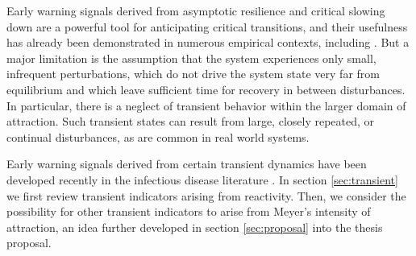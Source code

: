 Early warning signals derived from asymptotic resilience and critical slowing down are a powerful tool for anticipating critical transitions, and their usefulness has already been demonstrated in numerous empirical contexts, including . But a major limitation is the assumption that the system experiences only small, infrequent perturbations, which do not drive the system state very far from equilibrium and which leave sufficient time for recovery in between disturbances. In particular, there is a neglect of transient behavior within the larger domain of attraction. Such transient states can result from large, closely repeated, or continual disturbances, as are common in real world systems.  

Early warning signals derived from certain transient dynamics have been developed recently in the infectious disease literature \cite{oreganTransientIndicatorsTipping2020}. In section \ref{sec:transient} we first review transient indicators arising from reactivity. Then, we consider the possibility for other transient indicators to arise from Meyer's intensity of attraction, an idea further developed in section \ref{sec:proposal} into the thesis proposal. 























